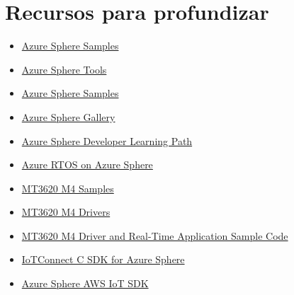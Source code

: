 \section{Recursos para profundizar}
\begin{itemize}
	\item
	\href{https://github.com/Azure/azure-sphere-samples}{Azure Sphere Samples}
	\item 
	\href{https://github.com/Azure/azure-sphere-tools}{Azure Sphere Tools}
	\item 
	\href{https://github.com/Azure/azure-sphere-samples}{Azure Sphere Samples}
	\item 
	\href{https://github.com/Azure/azure-sphere-gallery}{Azure Sphere Gallery}
	\item 
	\href{https://github.com/MicrosoftDocs/Azure-Sphere-Developer-Learning-Path}{Azure Sphere Developer Learning Path}
	\item 
	\href{https://github.com/Azure-Samples/Azure-RTOS-on-Azure-Sphere-Mediatek-MT3620}{Azure RTOS on Azure Sphere}
	\item 
	\href{https://github.com/CodethinkLabs/mt3620-m4-samples/}{MT3620 M4 Samples}
	\item 
	\href{https://github.com/CodethinkLabs/mt3620-m4-drivers}{MT3620 M4 Drivers}
	\item 
	\href{https://github.com/MediaTek-Labs/mt3620_m4_software/}{MT3620 M4 Driver and Real-Time Application Sample Code}
	\item 
	\href{https://github.com/avnet-iotconnect/iotc-sphereos-sdk}{IoTConnect C SDK for Azure Sphere}
	\item 
	\href{https://github.com/xiongyu0523/azure-sphere-aws-iot-device-sdk-embedded-c}{Azure Sphere AWS IoT SDK}
\end{itemize}